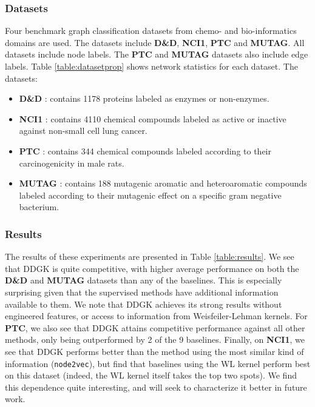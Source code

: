 \documentclass[sigconf]{acmart}
\newcommand{\ours}{\textsc{DDGK}}
\begin{document}
\subsubsection{Datasets}

\label{sec:datasets}
Four benchmark graph classification datasets from chemo- and bio-informatics domains are used. The datasets include \textbf{D\&D}, \textbf{NCI1}, \textbf{PTC} and \textbf{MUTAG}.
All datasets include node labels.
The \textbf{PTC} and \textbf{MUTAG} datasets also include edge labels.
Table \ref{table:datasetprop} shows network statistics for each dataset.
The datasets:
\begin{itemize}
\item \textbf{D\&D} \citep{dobson2003distinguishing}:   contains 1178 proteins labeled as enzymes or non-enzymes.
\item \textbf{NCI1} \citep{45b3e5c6d2ee4938b77995a88ee0b928}: contains 4110 chemical compounds labeled as active or inactive against non-small cell lung cancer.
\item \textbf{PTC} \citep{toivonen2003statistical}: contains 344 chemical compounds labeled according to their carcinogenicity in male rats.
\item \textbf{MUTAG} \citep{doi:10.1021/jm00106a046}:  contains 188 mutagenic aromatic and heteroaromatic compounds labeled according to their mutagenic effect on a specific gram negative bacterium.
\end{itemize}

\subsubsection{Results}

The results of these experiments are presented in Table \ref{table:results}.
We see that \ours{} is quite competitive, with higher average performance on both the \textbf{D\&D} and \textbf{MUTAG} datasets than any of the baselines.  
This is especially surprising given that the supervised methods have additional information available to them.
We note that \ours{} achieves its strong results without engineered features, or access to information from Weisfeiler-Lehman kernels.
For \textbf{PTC}, we also see that \ours{} attains competitive performance against all other methods, only being outperformed by 2 of the 9 baselines.
Finally, on \textbf{NCI1}, we see that \ours{} performs better than the method using the most similar kind of information (\texttt{node2vec}), but find that baselines using the WL kernel perform best on this dataset (indeed, the WL kernel itself takes the top two spots).
We find this dependence quite interesting, and will seek to characterize it better in future work.
\end{document}
